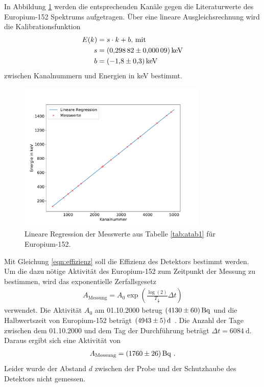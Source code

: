 In Abbildung \ref{fig:Kalibrierung} werden die entsprechenden Kanäle gegen die Literaturwerte des Europium-152 Spektrums aufgetragen.
Über eine lineare Ausgleichsrechnung wird die Kalibrationsfunktion
\begin{align*}
E(k) &= s \cdot k + b \text{, mit}\\
  s &= \SI{0.29882+-0.00009}{\kilo\electronvolt}\\
  b &= \SI{ -1.8+-0.3}{\kilo\electronvolt}
\end{align*}
zwischen Kanalnummern und Energien in keV bestimmt.
\begin{figure}
\centering
\includegraphics[width=0.8\textwidth]{python/plots/kalibrierung.pdf}
\caption{Lineare Regression der Messwerte aus Tabelle \ref{tab:atab1} für Europium-152.}
\label{fig:Kalibrierung}
\end{figure}
Mit Gleichung \eqref{eqn:effizienz} soll die Effizienz des Detektors bestimmt werden.
Um die dazu nötige Aktivität des Europium-152 zum Zeitpunkt der Messung zu bestimmen, wird das exponentielle Zerfallsgesetz
\begin{align}
A_\text{Messung}=A_0\exp\left(\frac{\log(2)}{T_{\frac{1}{2}}}\Delta t\right)
\end{align}
verwendet.
Die Aktivität $A_0$ am 01.10.2000 betrug $\SI{4130+-60}{\becquerel}$ und die Halbwertszeit von Europium-152 beträgt $\SI{4943+-5}{\day}$ \cite{sample}.
Die Anzahl der Tage zwischen dem 01.10.2000 und dem Tag der Durchführung beträgt $\Delta t=\SI{6084}{\day}$.
Daraus ergibt sich eine Aktivität von
\begin{align*}
A_\text{Messung}=\SI{1760+-26}{\becquerel} \text{ .}
\end{align*}
Leider wurde der Abstand $d$ zwischen der Probe und der Schutzhaube des Detektors nicht gemessen.
